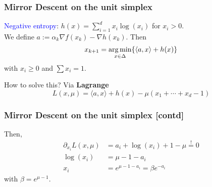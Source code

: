 \documentclass{beamer}
\begin{document}

\begin{frame}
  \frametitle{Mirror Descent on the unit simplex}
    \textcolor{blue}{Negative entropy}: $h(x) = \sum_{i=1}^{d} x_i \log(x_i)$ for $ x_i > 0$. \\
    We define $a := \alpha_k \nabla f(x_k) - \nabla h(x_k)$. Then
    \begin{equation}
      x_{k+1} = \operatorname*{arg\,min}_{x \in \Delta} \{ \langle a, x \rangle + h(x)\}
    \end{equation}
    with $x_i \ge 0$ and $\sum x_i = 1$.
    \begin{block}{How to solve this?}
      Via \textbf{Lagrange }
      \begin{equation}
        L(x,\mu) = \langle a, x \rangle + h(x) - \mu (x_1+\cdots+ x_d -1)
      \end{equation}
    \end{block}
\end{frame}

\begin{frame}
  \frametitle{Mirror Descent on the unit simplex [contd]}
      Then,
      \begin{equation}
        \begin{aligned}
          \partial_{x_i} L(x,\mu) &= a_i + \log(x_i) +1 - \mu \overset{!}{=} 0 \\
          \log(x_i) &= \mu -1 - a_i  \\
          x_i &= e^{\mu - 1 - a_i} = \beta e^{-a_i}
        \end{aligned}
      \end{equation}
      with $\beta= e^{\mu-1}$.


\end{frame}
\end{document}
